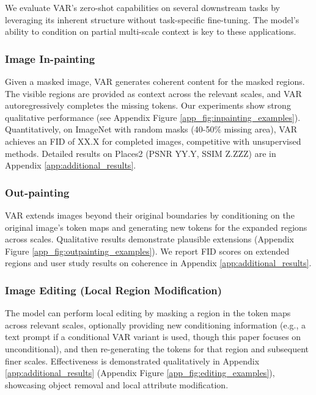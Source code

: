 \documentclass{article}
\begin{document}
We evaluate VAR's zero-shot capabilities on several downstream tasks by leveraging its inherent structure without task-specific fine-tuning. The model's ability to condition on partial multi-scale context is key to these applications.

\subsubsection{Image In-painting}
Given a masked image, VAR generates coherent content for the masked regions. The visible regions are provided as context across the relevant scales, and VAR autoregressively completes the missing tokens.
Our experiments show strong qualitative performance (see Appendix Figure \ref{app_fig:inpainting_examples}). Quantitatively, on ImageNet with random masks (40-50\% missing area), VAR achieves an FID of XX.X for completed images, competitive with unsupervised methods. Detailed results on Places2 \cite{zhou2017places} (PSNR YY.Y, SSIM Z.ZZZ) are in Appendix \ref{app:additional_results}.

\subsubsection{Out-painting}
VAR extends images beyond their original boundaries by conditioning on the original image's token maps and generating new tokens for the expanded regions across scales.
Qualitative results demonstrate plausible extensions (Appendix Figure \ref{app_fig:outpainting_examples}). We report FID scores on extended regions and user study results on coherence in Appendix \ref{app:additional_results}.

\subsubsection{Image Editing (Local Region Modification)}
The model can perform local editing by masking a region in the token maps across relevant scales, optionally providing new conditioning information (e.g., a text prompt if a conditional VAR variant is used, though this paper focuses on unconditional), and then re-generating the tokens for that region and subsequent finer scales.
Effectiveness is demonstrated qualitatively in Appendix \ref{app:additional_results} (Appendix Figure \ref{app_fig:editing_examples}), showcasing object removal and local attribute modification.
\end{document}
